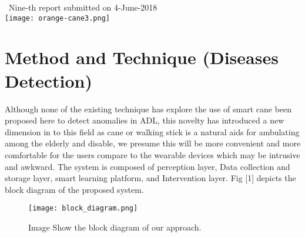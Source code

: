 \documentclass[a4paper, parskip=full]{scrartcl}
\begin{document}
\begin{titlepage}
	
	
	{\large \ Nine-th report submitted on 4-June-2018}\\[0.2cm] %
	
	
	\texttt{[image: orange-cane3.png]}\\[0.2cm] %
	
	
	\vfill %
	
\end{titlepage}


\section*{Method and Technique (Diseases Detection)}
 
Although none of the existing technique has explore the use of smart cane been proposed here to detect anomalies in ADL, this novelty has introduced a new dimension in to this field as cane or walking stick is a natural aids for ambulating among the elderly and disable, we presume this will be more convenient and more comfortable for the users compare to the wearable devices which may be intrusive and awkward. The system is composed of perception layer, Data collection and storage layer, smart learning platform, and Intervention layer. Fig [1] depicts the block diagram of the proposed system.
\begin{figure}
	\centering
	\texttt{[image: block\_diagram.png]}
		
	\caption{Image Show the block diagram of our approach.}
	
\end{figure}
\end{document}
